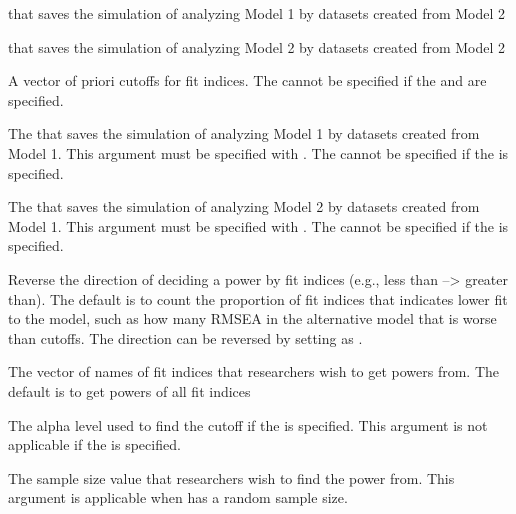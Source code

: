 \documentclass[a4paper]{book}
\begin{document}
\begin{Arguments}
\begin{ldescription}
\item[\code{dat2Mod1}] 
 that saves the simulation of analyzing Model 1 by datasets created from Model 2

\item[\code{dat2Mod2}] 
 that saves the simulation of analyzing Model 2 by datasets created from Model 2

\item[\code{cutoff}] 
A vector of priori cutoffs for fit indices. The  cannot be specified if the  and  are specified.

\item[\code{dat1Mod1}] 
The  that saves the simulation of analyzing Model 1 by datasets created from Model 1. This argument must be specified with . The  cannot be specified if the  is specified.

\item[\code{dat1Mod2}] 
The  that saves the simulation of analyzing Model 2 by datasets created from Model 1. This argument must be specified with . The  cannot be specified if the  is specified.

\item[\code{revDirec}] 
Reverse the direction of deciding a power by fit indices (e.g., less than --> greater than). The default is to count the proportion of fit indices that indicates lower fit to the model, such as how many RMSEA in the alternative model that is worse than cutoffs. The direction can be reversed by setting as .

\item[\code{usedFit}] 
The vector of names of fit indices that researchers wish to get powers from. The default is to get powers of all fit indices

\item[\code{alpha}] 
The alpha level used to find the cutoff if the  is specified. This argument is not applicable if the  is specified.

\item[\code{nVal}] 
The sample size value that researchers wish to find the power from. This argument is applicable when  has a random sample size. 


\end{ldescription}
\end{Arguments}
\end{document}
